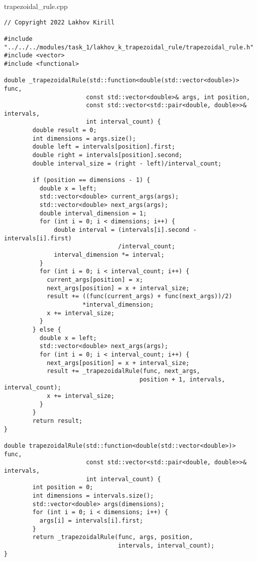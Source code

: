 \documentclass{report}
\begin{document}
trapezoidal\_rule.cpp
\begin{lstlisting}
// Copyright 2022 Lakhov Kirill

#include "../../../modules/task_1/lakhov_k_trapezoidal_rule/trapezoidal_rule.h"
#include <vector>
#include <functional>

double _trapezoidalRule(std::function<double(std::vector<double>)> func,
                       const std::vector<double>& args, int position,
                       const std::vector<std::pair<double, double>>& intervals,
                       int interval_count) {
        double result = 0;
        int dimensions = args.size();
        double left = intervals[position].first;
        double right = intervals[position].second;
        double interval_size = (right - left)/interval_count;

        if (position == dimensions - 1) {
          double x = left;
          std::vector<double> current_args(args);
          std::vector<double> next_args(args);
          double interval_dimension = 1;
          for (int i = 0; i < dimensions; i++) {
              double interval = (intervals[i].second - intervals[i].first)
                                /interval_count;
              interval_dimension *= interval;
          }
          for (int i = 0; i < interval_count; i++) {
            current_args[position] = x;
            next_args[position] = x + interval_size;
            result += ((func(current_args) + func(next_args))/2)
                      *interval_dimension;
            x += interval_size;
          }
        } else {
          double x = left;
          std::vector<double> next_args(args);
          for (int i = 0; i < interval_count; i++) {
            next_args[position] = x + interval_size;
            result += _trapezoidalRule(func, next_args,
                                      position + 1, intervals, interval_count);
            x += interval_size;
          }
        }
        return result;
}

double trapezoidalRule(std::function<double(std::vector<double>)> func,
                       const std::vector<std::pair<double, double>>& intervals,
                       int interval_count) {
        int position = 0;
        int dimensions = intervals.size();
        std::vector<double> args(dimensions);
        for (int i = 0; i < dimensions; i++) {
          args[i] = intervals[i].first;
        }
        return _trapezoidalRule(func, args, position,
                                intervals, interval_count);
}
\end{lstlisting}
\end{document}
